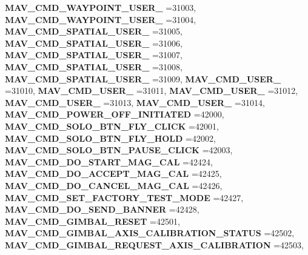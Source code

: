 \begin{DoxyCompactItemize}
\newline
\textbf{ M\+A\+V\+\_\+\+C\+M\+D\+\_\+\+W\+A\+Y\+P\+O\+I\+N\+T\+\_\+\+U\+S\+E\+R\+\_} =31003, 
\textbf{ M\+A\+V\+\_\+\+C\+M\+D\+\_\+\+W\+A\+Y\+P\+O\+I\+N\+T\+\_\+\+U\+S\+E\+R\+\_} =31004, 
\textbf{ M\+A\+V\+\_\+\+C\+M\+D\+\_\+\+S\+P\+A\+T\+I\+A\+L\+\_\+\+U\+S\+E\+R\+\_} =31005, 
\textbf{ M\+A\+V\+\_\+\+C\+M\+D\+\_\+\+S\+P\+A\+T\+I\+A\+L\+\_\+\+U\+S\+E\+R\+\_} =31006, 
\newline
\textbf{ M\+A\+V\+\_\+\+C\+M\+D\+\_\+\+S\+P\+A\+T\+I\+A\+L\+\_\+\+U\+S\+E\+R\+\_} =31007, 
\textbf{ M\+A\+V\+\_\+\+C\+M\+D\+\_\+\+S\+P\+A\+T\+I\+A\+L\+\_\+\+U\+S\+E\+R\+\_} =31008, 
\textbf{ M\+A\+V\+\_\+\+C\+M\+D\+\_\+\+S\+P\+A\+T\+I\+A\+L\+\_\+\+U\+S\+E\+R\+\_} =31009, 
\textbf{ M\+A\+V\+\_\+\+C\+M\+D\+\_\+\+U\+S\+E\+R\+\_} =31010, 
\newline
\textbf{ M\+A\+V\+\_\+\+C\+M\+D\+\_\+\+U\+S\+E\+R\+\_} =31011, 
\textbf{ M\+A\+V\+\_\+\+C\+M\+D\+\_\+\+U\+S\+E\+R\+\_} =31012, 
\textbf{ M\+A\+V\+\_\+\+C\+M\+D\+\_\+\+U\+S\+E\+R\+\_} =31013, 
\textbf{ M\+A\+V\+\_\+\+C\+M\+D\+\_\+\+U\+S\+E\+R\+\_} =31014, 
\newline
\textbf{ M\+A\+V\+\_\+\+C\+M\+D\+\_\+\+P\+O\+W\+E\+R\+\_\+\+O\+F\+F\+\_\+\+I\+N\+I\+T\+I\+A\+T\+ED} =42000, 
\textbf{ M\+A\+V\+\_\+\+C\+M\+D\+\_\+\+S\+O\+L\+O\+\_\+\+B\+T\+N\+\_\+\+F\+L\+Y\+\_\+\+C\+L\+I\+CK} =42001, 
\textbf{ M\+A\+V\+\_\+\+C\+M\+D\+\_\+\+S\+O\+L\+O\+\_\+\+B\+T\+N\+\_\+\+F\+L\+Y\+\_\+\+H\+O\+LD} =42002, 
\textbf{ M\+A\+V\+\_\+\+C\+M\+D\+\_\+\+S\+O\+L\+O\+\_\+\+B\+T\+N\+\_\+\+P\+A\+U\+S\+E\+\_\+\+C\+L\+I\+CK} =42003, 
\newline
\textbf{ M\+A\+V\+\_\+\+C\+M\+D\+\_\+\+D\+O\+\_\+\+S\+T\+A\+R\+T\+\_\+\+M\+A\+G\+\_\+\+C\+AL} =42424, 
\textbf{ M\+A\+V\+\_\+\+C\+M\+D\+\_\+\+D\+O\+\_\+\+A\+C\+C\+E\+P\+T\+\_\+\+M\+A\+G\+\_\+\+C\+AL} =42425, 
\textbf{ M\+A\+V\+\_\+\+C\+M\+D\+\_\+\+D\+O\+\_\+\+C\+A\+N\+C\+E\+L\+\_\+\+M\+A\+G\+\_\+\+C\+AL} =42426, 
\textbf{ M\+A\+V\+\_\+\+C\+M\+D\+\_\+\+S\+E\+T\+\_\+\+F\+A\+C\+T\+O\+R\+Y\+\_\+\+T\+E\+S\+T\+\_\+\+M\+O\+DE} =42427, 
\newline
\textbf{ M\+A\+V\+\_\+\+C\+M\+D\+\_\+\+D\+O\+\_\+\+S\+E\+N\+D\+\_\+\+B\+A\+N\+N\+ER} =42428, 
\textbf{ M\+A\+V\+\_\+\+C\+M\+D\+\_\+\+G\+I\+M\+B\+A\+L\+\_\+\+R\+E\+S\+ET} =42501, 
\textbf{ M\+A\+V\+\_\+\+C\+M\+D\+\_\+\+G\+I\+M\+B\+A\+L\+\_\+\+A\+X\+I\+S\+\_\+\+C\+A\+L\+I\+B\+R\+A\+T\+I\+O\+N\+\_\+\+S\+T\+A\+T\+US} =42502, 
\textbf{ M\+A\+V\+\_\+\+C\+M\+D\+\_\+\+G\+I\+M\+B\+A\+L\+\_\+\+R\+E\+Q\+U\+E\+S\+T\+\_\+\+A\+X\+I\+S\+\_\+\+C\+A\+L\+I\+B\+R\+A\+T\+I\+ON} =42503, 

\end{DoxyCompactItemize}
